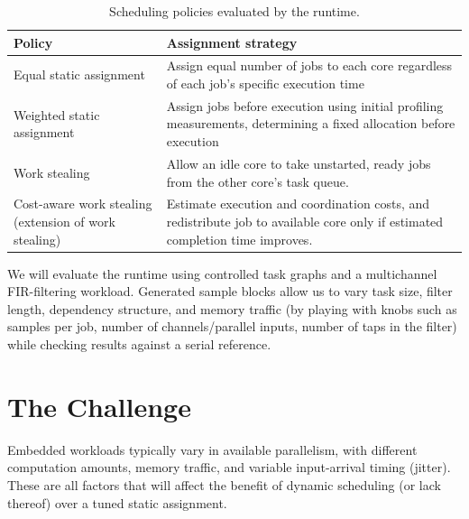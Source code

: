 \documentclass[11pt]{article}
\begin{document}
\begin{table}[H]
\centering
\begin{tabularx}{\linewidth}{@{}lX@{}}
\toprule
\textbf{Policy} & \textbf{Assignment strategy} \\
\midrule[0.8pt]

Equal static assignment &
Assign equal number of jobs to each core regardless of each job's specific execution time \\

\midrule[0.25pt]

Weighted static assignment &
Assign jobs before execution using initial profiling measurements, determining a fixed allocation before execution \\
\midrule[0.25pt]

Work stealing &
Allow an idle core to take unstarted, ready jobs from the other core's task queue. \\
\midrule[0.25pt]

Cost-aware work stealing (extension of work stealing)&
Estimate execution and coordination costs, and redistribute job to available core only if estimated completion time improves. \\

\bottomrule
\end{tabularx}
\caption{Scheduling policies evaluated by the runtime.}
\label{tab:policies}
\end{table}

We will evaluate the runtime using controlled task graphs and a
multichannel FIR-filtering workload. Generated sample blocks allow us to vary task size, filter length, dependency structure, and memory traffic (by playing with knobs such as samples per job, number of channels/parallel inputs, number of taps in the filter) while checking results against a serial reference.

\section{The Challenge}
Embedded workloads typically vary in available parallelism, with different computation amounts, memory traffic, and variable input-arrival timing (jitter). These are all factors that will affect the benefit of dynamic scheduling (or lack thereof) over a tuned static assignment. 
\end{document}
